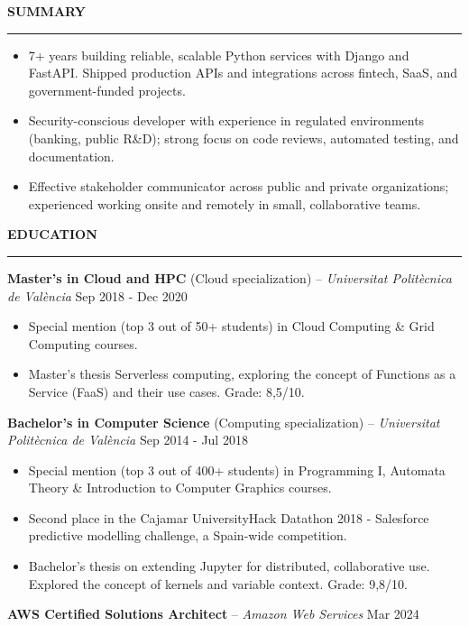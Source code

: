 \documentclass[10pt,a4paper,ragged2e]{altacv}
\renewcommand{\cvsection}[2][]{%
  \bigskip%
  {\color{heading}\large\bfseries\MakeUppercase{#2}}\\[-1ex]%
  {\color{heading}\rule{\linewidth}{0.5pt}\par}\medskip
}
\newcommand{\cvedu}[3]{%
  #1 -- \textit{#2} \hfill {\small #3}\par\smallskip
}
\begin{document}

\makecvheader

\cvsection{Summary}
{\small
\begin{itemize}[nosep,topsep=0pt,parsep=0pt,partopsep=0pt,leftmargin=*]
\item 7+ years building reliable, scalable Python services with Django and FastAPI. Shipped production APIs and integrations across fintech, SaaS, and government-funded projects.
\item Security-conscious developer with experience in regulated environments (banking, public R\&D); strong focus on code reviews, automated testing, and documentation.
\item Effective stakeholder communicator across public and private organizations; experienced working onsite and remotely in small, collaborative teams.
\end{itemize}
}

\cvsection{Education}
\cvedu{\textbf{Master's in Cloud and HPC} (Cloud specialization)}{Universitat Politècnica de València}{Sep 2018 - Dec 2020}
{\small
\begin{itemize}[nosep,topsep=0pt,parsep=0pt,partopsep=0pt,leftmargin=*]
\item Special mention (top 3 out of 50+ students) in Cloud Computing \& Grid Computing courses.
\item Master's thesis Serverless computing, exploring the concept of Functions as a Service (FaaS) and their use cases. Grade: 8,5/10.
\end{itemize}
}\medskip
\cvedu{\textbf{Bachelor's in Computer Science} (Computing specialization)}{Universitat Politècnica de València}{Sep 2014 - Jul 2018}
{\small
\begin{itemize}[nosep,topsep=0pt,parsep=0pt,partopsep=0pt,leftmargin=*]
\item Special mention (top 3 out of 400+ students) in Programming I, Automata Theory \& Introduction to Computer Graphics courses.
\item Second place in the Cajamar UniversityHack Datathon 2018 - Salesforce predictive modelling challenge, a Spain-wide competition.
\item Bachelor's thesis on extending Jupyter for distributed, collaborative use. Explored the concept of kernels and variable context. Grade: 9,8/10.
\end{itemize}
}\medskip
\cvedu{\textbf{AWS Certified Solutions Architect}}{Amazon Web Services}{Mar 2024}
\end{document}
